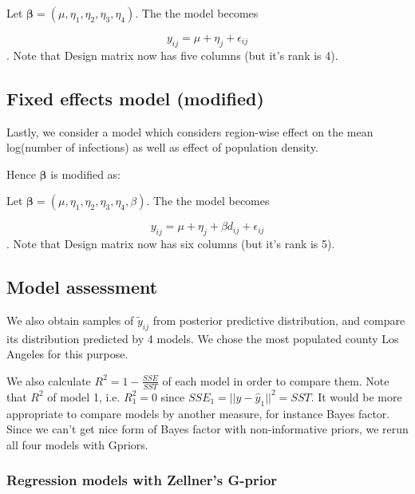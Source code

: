 \documentclass[11pt,twocolumn]{asaproc}
\begin{document}
Let $\pmb{\beta} =  (\mu, \eta_1, \eta_2, \eta_3, \eta_4)$. The the model becomes 
 
 $$y_{ij} = \mu + \eta_j + \epsilon_{ij}$$. Note that Design matrix now has five columns (but it's rank is 4). 
 




\subsection{Fixed effects model (modified)}

Lastly, we consider a model which considers region-wise effect on the mean log(number of infections) as well as effect of population density. 
 
Hence $\pmb{\beta}$ is modified as: 
 
 Let $\pmb{\beta} =  (\mu, \eta_1, \eta_2, \eta_3, \eta_4, \beta)$. The the model becomes 
 
 $$y_{ij} = \mu + \eta_j + \beta d_{ij} +  \epsilon_{ij}$$. Note that Design matrix now has six columns (but it's rank is 5). 
 




\subsection{Model assessment}

We also obtain samples of $\tilde{y}_{ij}$ from posterior predictive distribution, and compare its distribution predicted by 4 models. We chose the most populated county Los Angeles for this purpose. 

We also calculate $R^2 = 1 - \frac{SSE}{SST}$ of each model in order to compare them. Note that $R^2$ of model 1, i.e. $R^2_1 = 0$ since $SSE_1 = ||y-\hat{y}_1||^2 = SST$. It would be more appropriate to compare models by another measure, for instance Bayes factor. Since we can't get nice form of Bayes factor with non-informative priors, we re\-run all four models with G\-priors. 

\subsubsection{Regression models with Zellner's G-prior}
\end{document}
